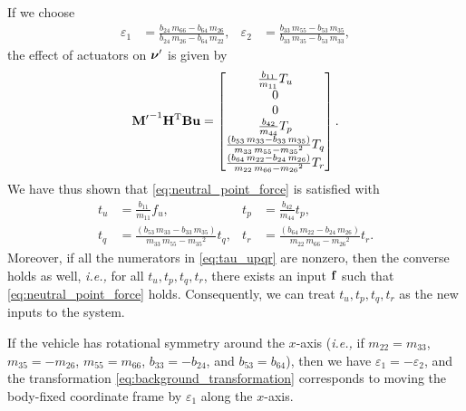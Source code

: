 If we choose
\begin{align}
    \varepsilon_1 &= \frac{b_{24}\,m_{66}-b_{64}\,m_{26}}{b_{24}\,m_{26}-b_{64}\,m_{22}}, &
    \varepsilon_2 &= \frac{b_{33}\,m_{55}-b_{53}\,m_{35}}{b_{33}\,m_{35}-b_{53}\,m_{33}},
\end{align}
the effect of actuators on $\bm{\nu}^{\prime}$ is given by
\begin{equation}
    {\mathbf{M}^{\prime}}^{-1}\mathbf{H}^{\mathrm{T}}\mathbf{B}\mathbf{u} =
    \begin{bmatrix}
        \frac{b_{11}}{m_{11}} T_{u} \\
        0 \\ 
        0 \\ 
        \frac{b_{42}}{m_{44}} T_{p} \\ 
        \frac{\left(b_{53}\,m_{33}-b_{33}\,m_{35}\right)}{m_{33}\,m_{55}-{m_{35}}^2} T_{q} \\ 
        \frac{\left(b_{64}\,m_{22}-b_{24}\,m_{26}\right)}{m_{22}\,m_{66}-{m_{26}}^2} T_{r}
    \end{bmatrix}.
\end{equation}
We have thus shown that \eqref{eq:neutral_point_force} is satisfied with
\begin{subequations}
    \begin{align}
        t_u &= \frac{b_{11}}{m_{11}} f_{u}, &
        t_p &= \frac{b_{42}}{m_{44}} t_{p}, \\
        t_q &= \frac{\left(b_{53}\,m_{33}-b_{33}\,m_{35}\right)}{m_{33}\,m_{55}-{m_{35}}^2} t_{q}, &
        t_r &= \frac{\left(b_{64}\,m_{22}-b_{24}\,m_{26}\right)}{m_{22}\,m_{66}-{m_{26}}^2} t_{r}.
    \end{align} 
    \label{eq:tau_upqr}
\end{subequations}
Moreover, if all the numerators in \eqref{eq:tau_upqr} are nonzero, then the converse holds as well, \emph{i.e.,} for all $t_u, t_p, t_q, t_r$, there exists an input $\mathbf{f}$ such that \eqref{eq:neutral_point_force} holds.
Consequently, we can treat $t_u, t_p, t_q, t_r$ as the new inputs to the system.

\begin{rmk}
    If the vehicle has rotational symmetry around the $x$-axis (\emph{i.e.,} if $m_{22} = m_{33}$, $m_{35} = -m_{26}$, $m_{55} = m_{66}$, $b_{33} = -b_{24}$, and $b_{53} = b_{64}$), then we have $\varepsilon_1 = -\varepsilon_2$, and the transformation \eqref{eq:background_transformation} corresponds to moving the body-fixed coordinate frame by $\varepsilon_1$ along the $x$-axis.
\end{rmk}

